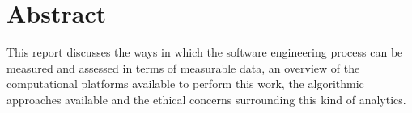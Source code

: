 \documentclass[a4paper]{article}
\begin{document}
\clearpage
\large{
\tableofcontents

\clearpage

\section{Abstract}
This report discusses the ways in which the software engineering process can be measured and assessed in terms of measurable data, an overview of the computational platforms available to perform this work, the algorithmic approaches available and the ethical concerns surrounding this kind of analytics.

}
\end{document}
